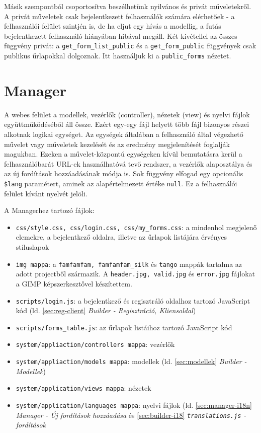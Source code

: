 \documentclass[12pt,a4paper,twoside]{article}
\newcommand{\fitem}[1]{\item \texttt{#1}:}
\begin{document}
Másik szempontból csoportosítva beszélhetünk nyilvános és privát műveletekről. A
privát műveletek csak bejelentkezett felhasználók számára elérhetőek - a
felhasználói felület szintjén is, de ha eljut egy hívás a modellig,
a futás bejelentkezett felhasználó hiányában hibával megáll. Két kivétellel az
összes függvény privát: a \texttt{get\_form\_list\_public} és a
\texttt{get\_form\_public} függvények csak publikus űrlapokkal dolgoznak. Itt
használjuk ki a \texttt{public\_forms} nézetet.


\section{Manager}

A webes felület a modellek, vezérlők (controller), nézetek (view) és nyelvi fájlok
együttműködéséből áll össze. Ezért egy-egy fájl helyett több fájl bizonyos
részei alkotnak logikai egységet. Az egységek általában a felhasználó által
végezhető művelet vagy műveletek kezelését és az eredmény megjelenítését foglalják
magukban. Ezeken a művelet-központú egységeken kívül bemutatásra kerül a
felhasználóbarát URL-ek használhatóvá tevő rendszer, a vezérlők alaposztálya
és az új fordítások hozzáadásának módja is. Sok függvény elfogad egy opcionális
\texttt{\$lang} paramétert, aminek az alapértelmezett értéke \texttt{null}. Ez a
felhasználói felület kívánt nyelvét jelöli.

A Managerhez tartozó fájlok:
\begin{itemize}
\fitem{css/style.css, css/login.css, css/my\_forms.css} a mindenhol
  megjelenő elemekre, a bejelentkező oldalra, illetve az űrlapok listájára
  érvényes stíluslapok
\fitem{img mappa} a \texttt{famfamfam, famfamfam\_silk} és \texttt{tango}
  mappák tartalma az adott projectből származik. A \texttt{header.jpg,
    valid.jpg} és \texttt{error.jpg} fájlokat a GIMP képszerkesztővel
  készítettem.
\fitem{scripts/login.js} a bejelentkező és regisztráló oldalhoz tartozó
  JavaScript kód (ld. \ref{sec:reg-client} \textit{Builder - Regisztráció,
    Kliensoldal})
\fitem{scripts/forms\_table.js} az űrlapok listáihoz tartozó JavaScript kód
\fitem{system/appliaction/controllers mappa} vezérlők
\fitem{system/appliaction/models mappa} modellek (ld. \ref{sec:modellek}
  \textit{Builder - Modellek})
\fitem{system/application/views mappa} nézetek
\fitem{system/application/languages mappa} nyelvi fájlok
  (ld. \ref{sec:manager-i18n} \textit{Manager - Új fordítások hozzáadása} és
  \ref{sec:builder-i18} \textit{\texttt{translations.js} - fordítások}
\end{itemize}
\end{document}
